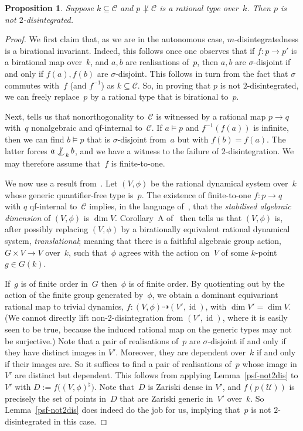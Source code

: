 \documentclass[\DocOpts]{amsart}
\newtheorem{proposition}[theorem]{Proposition}
\theoremstyle{definition}
\def\C{\mathcal{C}}
\def\U{\mathcal{U}}
\providecommand{\id}{\operatorname{id}}
\newcommand{\<}{\langle}
\renewcommand{\>}{\rangle}
\newcommand{\dto}{\dashrightarrow}
\def\notind#1#2{#1\setbox0=\hbox{\(#1x\)}\kern\wd0\hbox to 
0pt{\mathchardef\nn=12854\hss\(#1\nn\)\kern1.4\wd0\hss}\hbox to 
0pt{\hss\(#1\mid\)\hss}\lower.9\ht0 \hbox to 
0pt{\hss\(#1\smile\)\hss}\kern\wd0}
\def\nind{\mathop{\mathpalette\notind{}}}
\begin{document}
\begin{proposition}
\label{autiso2dis}
Suppose $k\subseteq\C$ and $p\not\perp\C$ is a rational type over~$k$.
Then $p$ is not $2$-disintegrated.
\end{proposition}

\begin{proof}
We first claim that, as we are in the autonomous case, $m$-disintegratedness is a birational invariant.
Indeed, this follows once one observes that if $f:p\to p'$ is a birational map over~$k$, and $a,b $ are realisations of~$p$, then $a, b$ are $\sigma$-disjoint if and only if $f(a),f(b)$ are $\sigma$-disjoint.
This follows in turn from the fact that $\sigma$ commutes with~$f$ (and $f^{-1}$) as $k\subseteq\C$.
So, in proving that $p$ is not $2$-disintegrated, we can freely replace~$p$ by a rational type that is birational to~$p$.

Next,  \cite[Proposition~2.12]{qfint} tells us that nonorthogonality to~$\C$ is witnessed by a rational map $p\to q$ with~$q$ nonalgebraic and qf-internal to~$\C$.
If $a\models p$ and $f^{-1}(f(a))$ is infinite, then we can find $b\models p$ that is $\sigma$-disjoint from~$a$ but with $f(b)=f(a)$.
The latter forces $a\nind_kb$, and we have a witness to the failure of $2$-disintegration.
We may therefore assume that~$f$ is finite-to-one.

We now use a result from~\cite{bms}.
Let $(V,\phi)$ be the rational dynamical system over~$k$ whose generic quantifier-free type is~$p$.
The existence of finite-to-one $f:p\to q$ with $q$ qf-internal to~$\C$ implies, in the language of~\cite{bms}, that the {\em stabilised algebraic dimension} of $(V,\phi)$ is $\dim V$.
Corollary~A of~\cite{bms} then tells us that $(V,\phi)$ is, after possibly replacing $(V,\phi)$ by a birationally equivalent rational dynamical system, {\em translational}; meaning that there is a faithful algebraic group action, $G\times V\to V$ over~$k$, such that~$\phi$ agrees with the action on~$V$ of some $k$-point $g\in G(k)$.

If~$g$ is of finite order in~$G$ then~$\phi$ is of finite order.
By quotienting out by the action of the finite group generated by~$\phi$, we obtain a dominant equivariant rational map to trivial dynamics, $f:(V,\phi)\dto(V',\id)$, with $\dim V'=\dim V$.
(We cannot directly lift non-2-disintegration from $(V',\id)$, where it is easily seen to be true, because the induced rational map on the generic types may not be surjective.)
Note that a pair of realisations of~$p$ are $\sigma$-disjoint if and only if they have distinct images in $V'$.
Moreover, they are dependent over~$k$ if and only if their images are.
So it suffices to find a pair of realisations of~$p$ whose image in $V'$ are distinct but dependent.
This follows from applying Lemma~\ref{psf-not2dis} to $V'$ with 
$D:= f\big((V,\phi)^\sharp\big)$.
Note that~$D$ is Zariski dense in $V'$, and $f(p(\U))$ is precisely the set of points in~$D$ that are Zariski generic in~$V'$ over~$k$.
So Lemma~\ref{psf-not2dis} does indeed do the job for us, implying that~$p$ is not $2$-disintegrated in this case.


\end{proof}
\end{document}
